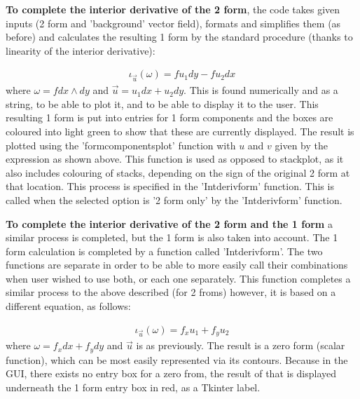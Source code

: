 \documentclass[11]{report}
\begin{document}
\noindent \textbf{To complete the interior derivative of the 2 form}, the code takes given inputs (2 form and 'background' vector field), formats and simplifies them (as before) and calculates the resulting 1 form by the standard procedure (thanks to linearity of the interior derivative):

\begin{equation}
	\label{T2} \begin{split}
		\iota_{\vec{u}}(\omega) = f u_{1} dy - f u_{2} dx
	\end{split}
\end{equation}
where $\omega = f dx\wedge dy$ and $\vec{u} = u_{1}dx + u_{2}dy$.
This is found numerically and as a string, to be able to plot it, and to be able to display it to the user.
This resulting 1 form is put into entries for 1 form components and the boxes are coloured into light green to show that these are currently displayed. The result is plotted using the 'form\textunderscore components\textunderscore plot' function with $u$ and $v$ given by the expression as shown above. This function is used as opposed to stack\textunderscore plot, as it also includes colouring of stacks, depending on the sign of the original 2 form at that location.
This process is specified in the 'Int\textunderscore deriv\textunderscore form' function. This is called when the selected option is '2 form only' by the 'Int\textunderscore deriv\textunderscore form' function.

\noindent \textbf{To complete the interior derivative of the 2 form and the 1 form} a similar process is completed, but the 1 form is also taken into account. The 1 form calculation is completed by a function called 'Int\textunderscore deriv\textunderscore form'. The two functions are separate in order to be able to more easily call their combinations when user wished to use both, or each one separately. This function completes a similar process to the above described (for 2 froms) however, it is based on a different equation, as follows:

\begin{equation}
	\label{T2} \begin{split}
		\iota_{\vec{u}}(\omega) = f_{x} u_{1} + f_{y} u_{2}
	\end{split}
\end{equation}
where $\omega = f_{x} dx + f_{y} dy$ and $\vec{u}$ is as previously. The result is a zero form (scalar function), which can be most easily represented via its contours. Because in the GUI, there exists no entry box for a zero from, the result of that is displayed underneath the 1 form entry box in red, as a Tkinter label.
\end{document}
